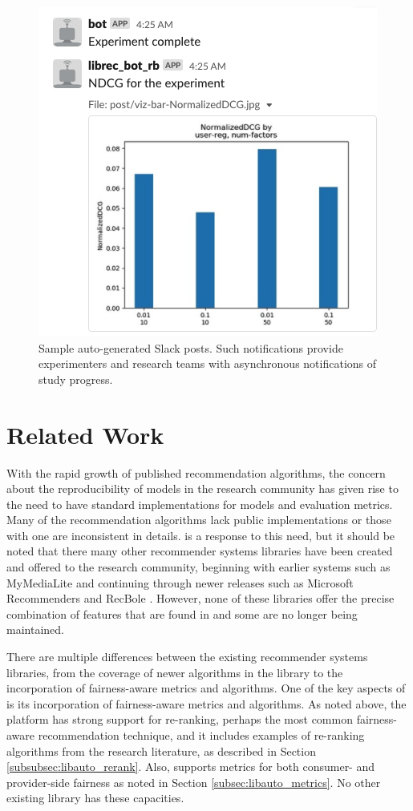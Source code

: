 \begin{figure}[!htb]
    \centering
    \includegraphics[width=0.6\linewidth]{imgs/la/slack-post.png}
    \caption{Sample auto-generated Slack posts. Such notifications provide experimenters and research teams with asynchronous notifications of study progress.}
    \label{fig:slack}
    \vspace{-0.15in}
\end{figure}

\section{Related Work}

With the rapid growth of published recommendation algorithms, the concern about the reproducibility of models in the research community has given rise to the need to have standard implementations for models and evaluation metrics. Many of the recommendation algorithms lack public implementations or those with one are inconsistent in details. \libauto{} is a response to this need, but it should be noted that there many other recommender systems libraries have been created and offered to the research community, beginning with earlier systems such as MyMediaLite \cite{MyMediaLite} and continuing through newer releases such as Microsoft Recommenders \cite{MicrosoftRecommenders} and RecBole \cite{recbole}. However, none of these libraries offer the precise combination of features that are found in \libauto{} and some are no longer being maintained.

There are multiple differences between the existing recommender systems libraries, from the coverage of newer algorithms in the library to the incorporation of fairness-aware metrics and algorithms. One of the key aspects of \libauto{} is its incorporation of fairness-aware metrics and algorithms. As noted above, the platform has strong support for re-ranking, perhaps the most common fairness-aware recommendation technique, and it includes examples of re-ranking algorithms from the research literature, as described in Section \ref{subsubsec:libauto_rerank}. Also, \libauto{} supports metrics for both consumer- and provider-side fairness as noted in Section \ref{subsec:libauto_metrics}. No other existing library has these capacities. 

